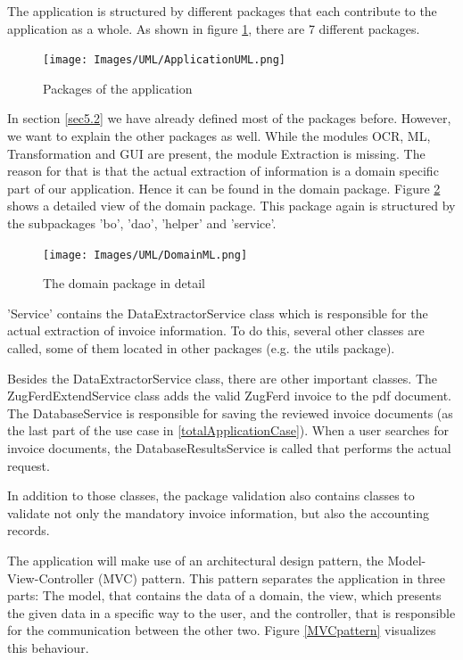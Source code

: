 The application is structured by different packages that each contribute to the application as a whole.
As shown in figure \ref{applicationUML}, there are 7 different packages. 

\begin{figure}[ht!]
\centering
\texttt{[image: Images/UML/ApplicationUML.png]}
\caption{Packages of the application \label{applicationUML}}
\end{figure}

In section \ref{sec5.2} we have already defined most of the packages before. However, we want to explain the other packages as well. While the modules OCR, ML, Transformation and GUI are present, the module Extraction is missing. The reason for that is that the actual extraction of information is a domain specific part of our application. Hence it can be found in the domain package. Figure \ref{domainUML} shows a detailed view of the domain package. This package again is structured by the subpackages 'bo', 'dao', 'helper' and 'service'.

\begin{figure}[ht!]
\centering
%
\texttt{[image: Images/UML/DomainML.png]}
\caption{The domain package in detail \label{domainUML}}
\end{figure}

'Service' contains the DataExtractorService class which is responsible for the actual extraction of invoice information. To do this, several other classes are called, some of them located in other packages (e.g. the utils package).

Besides the DataExtractorService class, there are other important classes. The ZugFerdExtendService class adds the valid ZugFerd invoice to the pdf document. The DatabaseService is responsible for saving the reviewed invoice documents (as the last part of the use case in \ref{totalApplicationCase}). When a user searches for invoice documents, the DatabaseResultsService is called that performs the actual request.

In addition to those classes, the package validation also contains classes to validate not only the mandatory invoice information, but also the accounting records.

The application will make use of an architectural design pattern, the Model-View-Controller (MVC) pattern.
This pattern separates the application in three parts: The model, that contains the data of a domain, the view, which presents the given data in a specific way to the user, and the controller, that is responsible for the communication between the other two. Figure \ref{MVCpattern} visualizes this behaviour.

